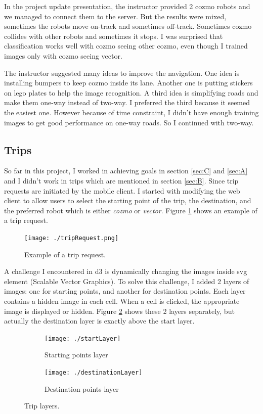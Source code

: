 \documentclass[12pt,a4paper]{article}
\begin{document}
In the project update presentation, the instructor provided 2 cozmo robots and we managed to connect them to the server. But the results were mixed, sometimes the robots move on-track and sometimes off-track. Sometimes cozmo collides with other robots and sometimes it stops. I was surprised that classification works well with cozmo seeing other cozmo, even though I trained images only with cozmo seeing vector. 

The instructor suggested many ideas to improve the navigation. One idea is installing bumpers to keep cozmo inside its lane. Another one is putting stickers on lego plates to help the image recognition. A third idea is simplifying roads and make them one-way instead of two-way. I preferred the third because it seemed the easiest one. However because of time constraint, I didn't have enough training images to get good performance on one-way roads. So I continued with two-way. 
 

\subsection{Trips}

So far in this project, I worked in achieving goals in section \ref{sec:C} and \ref{sec:A} and I didn't work in trips which are mentioned in section \ref{sec:B}. Since trip requests are initiated by the mobile client. I started with modifying the web client to allow users to select the starting point of the trip, the destination, and the preferred robot which is either \textit{cozmo} or \textit{vector}. Figure \ref{fig:tripRequest} shows an example of a trip request. 

\begin{figure}[H]
\center
\texttt{[image: ./tripRequest.png]}
\caption{Example of a trip request.} \label{fig:tripRequest}
\end{figure}

A challenge I encountered in d3 is dynamically changing the images inside svg element (Scalable Vector Graphics). To solve this challenge, I added 2 layers of images: one for starting points, and another for destination points. Each layer contains a hidden image in each cell. When a cell is clicked, the appropriate image is displayed or hidden. Figure \ref{fig:layers} shows these 2 layers separately, but actually the destination layer is exactly above the start layer. 
\begin{figure}[H]
     \center
     \begin{subfigure}[b]{0.45\textwidth}
         \centering
         \texttt{[image: ./startLayer]}
         \caption{Starting points layer}
     \end{subfigure}
     \hfill
     \begin{subfigure}[b]{0.45\textwidth}
         \centering
         \texttt{[image: ./destinationLayer]}
         \caption{Destination points layer}
     \end{subfigure}
     \caption{Trip layers.}
     \label{fig:layers}
\end{figure}
\end{document}
